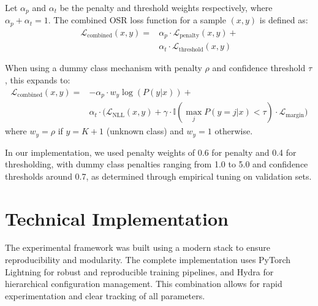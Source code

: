 \documentclass[11pt, a4paper]{article}
\begin{document}
\begin{definition}
Let $\alpha_p$ and $\alpha_t$ be the penalty and threshold weights respectively, where $\alpha_p + \alpha_t = 1$. The combined OSR loss function for a sample $(x, y)$ is defined as:
\begin{equation}
\begin{aligned}
\mathcal{L}_{\text{combined}}(x, y) = 
&\alpha_p \cdot \mathcal{L}_{\text{penalty}}(x, y) + \\
&\alpha_t \cdot \mathcal{L}_{\text{threshold}}(x, y)
\end{aligned}
\end{equation}

When using a dummy class mechanism with penalty $\rho$ and confidence threshold $\tau$, this expands to:
\begin{equation}
\begin{aligned}
\mathcal{L}_{\text{combined}}(x, y) = 
&-\alpha_p \cdot w_y \log(P(y|x)) + \\
&\alpha_t \cdot \big(\mathcal{L}_{\text{NLL}}(x,y) + \gamma \cdot \mathbb{I}(\max_j P(y=j|x) < \tau) \cdot \mathcal{L}_{\text{margin}}\big)
\end{aligned}
\end{equation}
where $w_y = \rho$ if $y = K+1$ (unknown class) and $w_y = 1$ otherwise.
\end{definition}

In our implementation, we used penalty weights of 0.6 for penalty and 0.4 for thresholding, with dummy class penalties ranging from 1.0 to 5.0 and confidence thresholds around 0.7, as determined through empirical tuning on validation sets.

\section{Technical Implementation}

The experimental framework was built using a modern stack to ensure reproducibility and modularity. The complete implementation uses PyTorch Lightning for robust and reproducible training pipelines, and Hydra for hierarchical configuration management. This combination allows for rapid experimentation and clear tracking of all parameters.
\end{document}
